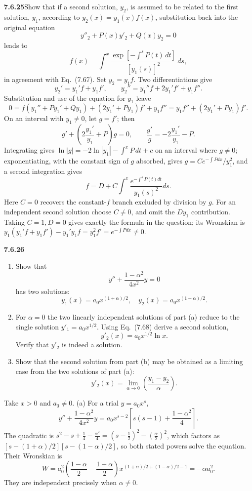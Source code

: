 \par\bigskip
\noindent\textbf{7.6.25}\quad Show that if a second solution, $y_{2}$, is
assumed to be related to the first solution, $y_{1}$, according to
$y_{2}(x)=y_{1}(x)f(x)$, substitution back into the original equation
\[
y''_{2}+P(x)y'_{2}+Q(x)y_{2}=0
\]
leads to
\[
f(x)=\int^{x}\frac{\exp\left[-\int^{s}P(t)\,dt\right]}{[y_{1}(s)]^{2}}\,ds,
\]
in agreement with Eq.~(7.67).
\solution
Set $y_2=y_1f$. Two differentiations give
\[
y_2'=y_1'f+y_1f',\qquad
y_2''=y_1''f+2y_1'f'+y_1f''.
\]
Substitution and use of the equation for $y_1$ leave
\[
0=f(y_1''+Py_1'+Qy_1)+(2y_1'+Py_1)f'+y_1f''
=y_1f''+(2y_1'+Py_1)f'.
\]
On an interval with $y_1\ne0$, let $g=f'$; then
\[
g'+\left(2\frac{y_1'}{y_1}+P\right)g=0,
\qquad
\frac{g'}g=-2\frac{y_1'}{y_1}-P.
\]
Integrating gives $\ln|g|=-2\ln|y_1|-\int^xP\,dt+c$ on an interval
where $g\ne0$; exponentiating, with the constant sign of $g$ absorbed,
gives $g=C e^{-\int Pdx}/y_1^2$, and a second integration gives
\[
\boxed{f=D+C\int^x\frac{e^{-\int^sP(t)dt}}{y_1(s)^2}ds}.
\]
Here $C=0$ recovers the constant-$f$ branch excluded by division by $g$.
For an independent second solution choose $C\ne0$, and omit the
$D y_1$ contribution. Taking $C=1,D=0$ gives exactly the formula in
the question; its Wronskian is
$y_1(y_1'f+y_1f')-y_1'y_1f=y_1^2f'=e^{-\int Pdx}\ne0$.

\par\bigskip
\noindent\textbf{7.6.26}\quad
{}
\begin{enumerate}
\item[(a)] Show that
  \[
  y''+\frac{1-\alpha^{2}}{4x^{2}}y=0
  \]
  has two solutions:
  \[
  y_{1}(x)=a_{0}x^{(1+\alpha)/2},\quad y_{2}(x)=a_{0}x^{(1-\alpha)/2}.
  \]
\item[(b)] For $\alpha=0$ the two linearly independent solutions of part (a)
  reduce to the single solution $y'_{1}=a_{0}x^{1/2}$. Using Eq.~(7.68) derive
  a second solution,
  \[
  y'_{2}(x)=a_{0}x^{1/2}\ln x.
  \]
  Verify that $y'_{2}$ is indeed a solution.
\item[(c)] Show that the second solution from part (b) may be obtained as a
  limiting case from the two solutions of part (a):
  \[
  y'_{2}(x)=\lim_{\alpha\to0}\left(\frac{y_{1}-y_{2}}{\alpha}\right).
  \]
\end{enumerate}
\solution
Take $x>0$ and $a_0\ne0$. (a) For a trial $y=a_0x^s$,
\[
y''+\frac{1-\alpha^2}{4x^2}y
=a_0x^{s-2}\left[s(s-1)+\frac{1-\alpha^2}{4}\right].
\]
The quadratic is
$s^2-s+\frac14-\frac{\alpha^2}4=(s-\frac12)^2-(\frac\alpha2)^2$, which
factors as
$[s-(1+\alpha)/2][s-(1-\alpha)/2]$, so both stated powers solve
the equation. Their Wronskian is
\[
W=a_0^2\left(\frac{1-\alpha}{2}-\frac{1+\alpha}{2}\right)
 x^{(1+\alpha)/2+(1-\alpha)/2-1}=-\alpha a_0^2.
\]
They are independent precisely when $\alpha\ne0$.

